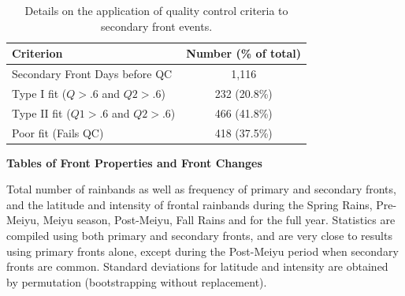 \documentclass[draft,grl]{agutexSI}
\begin{document}
\begin{article}
\begin{table}
\begin{tabular}{ l c}
\end{tabular}
\end{table}

\begin{table}

\caption{Details on the application of quality control criteria to secondary front events.}
\centering

\begin{tabular}{ l c}
	 Criterion & Number (\% of total) \\
	 \hline
	 Secondary Front Days before QC & 1,116 \\
	 Type I fit ($Q>.6$ and $Q2>.6$) & 232 (20.8\%) \\
	 Type II fit ($Q1>.6$ and $Q2>.6$) & 466 (41.8\%) \\
	 Poor fit (Fails QC) & 418 (37.5\%) \\
	 
\end{tabular}
\end{table}

\clearpage

\noindent\textbf{Tables of Front Properties and Front Changes}

\begin{table}

\caption{Total number of rainbands as well as frequency of primary and secondary fronts, and the latitude and intensity of frontal rainbands during the Spring Rains, Pre-Meiyu, Meiyu season, Post-Meiyu, Fall Rains and for the full year. Statistics are compiled using both primary and secondary fronts, and are very close to results using primary fronts alone, except during the Post-Meiyu period when secondary fronts are common. Standard deviations for latitude and intensity are obtained by permutation (bootstrapping without replacement).}
\centering


\end{table}
\end{article}
\end{document}
